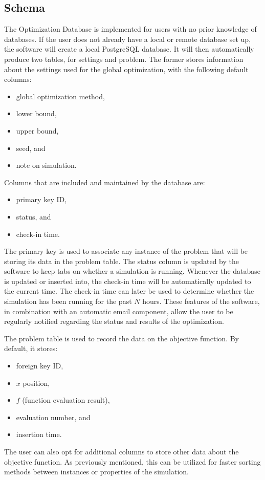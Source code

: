 \subsection{Schema}

The Optimization Database is implemented for users with no prior knowledge of databases. If the user does not already have a local or remote database set up, the software will create a local PostgreSQL database. It will then automatically produce two tables, for settings and problem. The former  stores information about the settings used for the global optimization, with the following default columns:
\begin{itemize}
    \item global optimization method,
    \item lower bound,
    \item upper bound,
    \item seed, and
    \item note on simulation. 
\end{itemize}
Columns that are included and maintained by the database are:
\begin{itemize}
    \item primary key ID,
    \item status, and 
    \item check-in time. 
\end{itemize}
The primary key is used to associate any instance of the problem that will be storing its data in the problem table. The status column is updated by the software to keep tabs on whether a simulation is running. Whenever the database is updated or inserted into, the check-in time will be automatically updated to the current time. The check-in time can later be used to determine whether the simulation has been running for the past $N$ hours. These features of the software, in combination with an automatic email component, allow the user to be regularly notified regarding the status and results of the optimization. 


The problem table is used to record the data on the objective function. By default, it stores: 
\begin{itemize}
    \item foreign key ID,
    \item $x$ position,
    \item $f$ (function evaluation result),
    \item evaluation number, and
    \item insertion time.
\end{itemize}
The user can also opt for additional columns to store other data about the objective function. As previously mentioned, this can be utilized for faster sorting methods between instances or properties of the simulation. 

